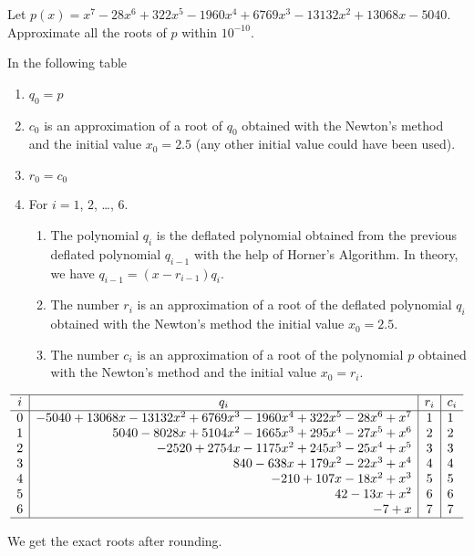 \begin{egg}
Let $p(x) = x^7 - 28x^6 +322x^5 - 1960x^4 + 6769x^3
- 13132x^2 +13068x - 5040$.  Approximate all the roots of $p$ within
$10^{-10}$.

In the following table
\begin{enumerate}
\item $q_0 = p$
\item $c_0$ is an approximation of a root of $q_0$ obtained with the
  Newton's method and the initial value $x_0 = 2.5$ (any
  other initial value could have been used).
\item $r_0 = c_0$
\item For $i=1$, $2$, \ldots, $6$.
{
\renewcommand{\labelenumii}{(\roman{enumii})}
\begin{enumerate}
\item The polynomial $q_i$ is the deflated polynomial obtained from the
  previous deflated polynomial $q_{i-1}$ with the help of Horner's
  Algorithm.  In theory, we have $q_{i-1} = (x-r_{i-1})q_i$.
\item The number $r_i$ is an approximation of a root of the deflated
  polynomial $q_i$ obtained with the Newton's method the initial value
  $x_0 = 2.5$.
\item The number $c_i$ is an approximation of a root of the polynomial
  $p$ obtained with the Newton's method and the initial value $x_0 = r_i$.
\end{enumerate}
}
\end{enumerate}

\[
\begin{array}{c|r|c|l}
\hline
i & \multicolumn{1}{c|}{q_i} & r_i & \multicolumn{1}{c}{c_i} \\
\hline
0 & -5040 + 13068x -13132x^2 + 6769x^3 -1960x^4 + 322x^5 -28x^6 + x^7
&  1 &  1 \\
1 & 5040 -8028x + 5104x^2 -1665x^3 +295x^4 -27x^5 + x^6 & 2 & 2 \\
2 & -2520 +2754x -1175x^2 + 245x^3 -25x^4 + x^5 & 3 & 3 \\
3 & 840 -638x + 179x^2 -22x^3 + x^4 & 4 & 4 \\
4 & -210 + 107x -18x^2 +x^3 & 5 & 5 \\
5 & 42 -13x + x^2 & 6 & 6 \\
6 & -7 + x & 7 & 7 \\
\hline
\end{array}
\]

We get the exact roots after rounding.
\end{egg}

